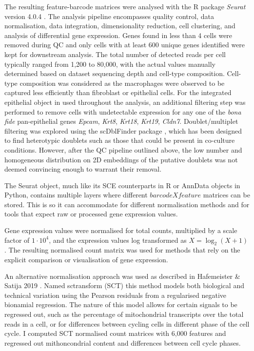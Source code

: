 The resulting feature-barcode matrices were analysed with the R package \textit{Seurat} version 4.0.4 \cite{hao_integrated_2021}. 
The analysis pipeline encompasses quality control, data normalisation, data integration, dimensionality reduction, cell clustering, and analysis of differential gene expression. 
Genes found in less than 4 cells were removed during QC and only cells with at least 600 unique genes identified were kept for downstream analysis. The total number of detected reads per cell typically ranged from 1,200 to 80,000, with the actual values manually determined based on dataset sequencing depth and cell-type composition. 
Cell-type composition was considered as the macrophages were observed to be captured less efficiently than fibroblast or epithelial cells.
For the integrated epithelial object in used throughout the analysis, an additional filtering step was performed to remove cells with undetectable expression for any one of the \emph{bona fide} pan-epithelial genes \textit{Epcam}, \textit{Krt8}, \textit{Krt18}, \textit{Krt19}, \textit{Cldn7}. 
Doublet/multiplet filtering was explored using the scDblFinder package \cite{germain_doublet_2022}, which has been designed to find heterotypic doublets such as those that could be present in co-culture conditions. However, after the QC pipeline outlined above, the low number and homogeneous distribution on 2D embeddings of the putative doublets was not deemed convincing enough to warrant their removal.

The Seurat object, much like its SCE counterparts in R or AnnData objects in Python, contains multiple layers where different \(barcode X feature\) matrices can be stored. This is so it can accommodate for different normalisation methods and for tools that expect raw or processed gene expression values. 

Gene expression values were normalised for total counts, multiplied by a scale factor of  \(1\cdot10^4\), and the expression values log transformed as \(X = \log_2 (X+1)\). The resulting normalised count matrix was used for methods that rely on the explicit comparison or visualisation of gene expression.

An alternative normalisation approach was used as described in Hafemeister \& Satija 2019 \cite{hafemeister_normalization_2019}. Named sctransform (SCT) this method models both biological and technical variation using the Pearson residuals from a regularised negative bionamial regression. The nature of this model allows for certain signals to be regressed out, such as the percentage of mitochondrial transcripts over the total reads in a cell, or for differences between cycling cells in different phase of the cell cycle. I computed SCT normalised count matrices with 6,000 features and regressed out mithoncondrial content and differences between cell cycle phases.

